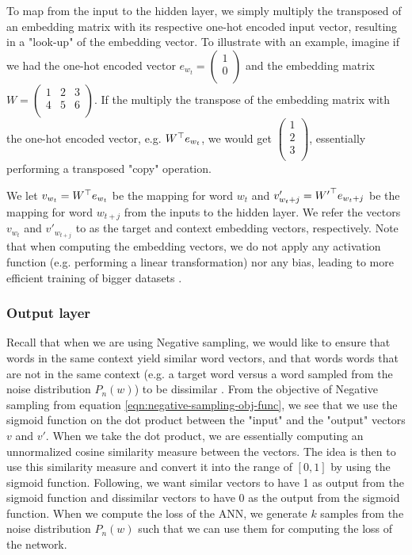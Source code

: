 \noindent
To map from the input to the hidden layer, we simply multiply the transposed of an embedding matrix with its respective one-hot encoded input vector, resulting in a "look-up" of the embedding vector. To illustrate with an example, imagine if we had the one-hot encoded vector $e_{w_t} = \left( \begin{smallmatrix}
    1\\
    0\\
\end{smallmatrix} \right)$ and the embedding matrix $W = \left( \begin{smallmatrix}
    1 & 2 & 3\\
    4 & 5 & 6\\
\end{smallmatrix} \right)$. If the multiply the transpose of the embedding matrix with the one-hot encoded vector, e.g. ${W}^\top e_{w_t}$, we would get $\left( \begin{smallmatrix}
    1\\
    2\\
    3\\
\end{smallmatrix} \right)$, essentially performing a transposed "copy" operation.

\noindent
We let $v_{w_t} = {W}^\top e_{w_t}$ be the mapping for word $w_t$ and $v'_{w_t+j} = {W'}^\top e_{w_t{+j}}$ be the mapping for word $w_{t+j}$ from the inputs to the hidden layer. We refer the vectors $v_{w_t}$ and $v'_{w_{t+j}}$ to as the target and context embedding vectors, respectively. Note that when computing the embedding vectors, we do not apply any activation function (e.g. performing a linear transformation) nor any bias, leading to more efficient training of bigger datasets \cite{mikolov2013a}.

\subsubsection{Output layer}
Recall that when we are using Negative sampling, we would like to ensure that words in the same context yield similar word vectors, and that words words that are not in the same context (e.g. a target word versus a word sampled from the noise distribution $P_n(w)$) to be dissimilar \cite{mikolov2013b}. From the objective of Negative sampling from equation \ref{eqn:negative-sampling-obj-func}, we see that we use the sigmoid function on the dot product between the "input" and the "output" vectors $v$ and $v'$. When we take the dot product, we are essentially computing an unnormalized cosine similarity measure between the vectors. The idea is then to use this similarity measure and convert it into the range of $[0, 1]$ by using the sigmoid function. Following, we want similar vectors to have 1 as output from the sigmoid function and dissimilar vectors to have 0 as the output from the sigmoid function. When we compute the loss of the ANN, we generate $k$ samples from the noise distribution $P_n(w)$ such that we can use them for computing the loss of the network.

